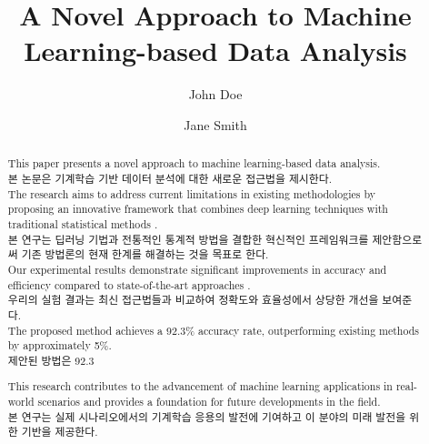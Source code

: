 \documentclass[preprint,12pt]{elsarticle}
\begin{document}
\begin{frontmatter}

\title{A Novel Approach to Machine Learning-based Data Analysis}

\author[label1]{John Doe}

\author[label2]{Jane Smith}



\begin{abstract}
This paper presents a novel approach to machine learning-based data analysis. \\
본 논문은 기계학습 기반 데이터 분석에 대한 새로운 접근법을 제시한다. \\

The research aims to address current limitations in existing methodologies by proposing an innovative framework that combines deep learning techniques with traditional statistical methods \cite{lecun2015deep}. \\
본 연구는 딥러닝 기법과 전통적인 통계적 방법을 결합한 혁신적인 프레임워크를 제안함으로써 기존 방법론의 현재 한계를 해결하는 것을 목표로 한다. \\

Our experimental results demonstrate significant improvements in accuracy and efficiency compared to state-of-the-art approaches \cite{goodfellow2016deep}. \\
우리의 실험 결과는 최신 접근법들과 비교하여 정확도와 효율성에서 상당한 개선을 보여준다. \\

The proposed method achieves a 92.3\% accuracy rate, outperforming existing methods by approximately 5\%. \\
제안된 방법은 92.3%

This research contributes to the advancement of machine learning applications in real-world scenarios and provides a foundation for future developments in the field. \\
본 연구는 실제 시나리오에서의 기계학습 응용의 발전에 기여하고 이 분야의 미래 발전을 위한 기반을 제공한다. \\
\end{abstract}


\end{frontmatter}
\end{document}
